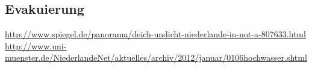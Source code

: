 \subsection{Evakuierung}
\url{http://www.spiegel.de/panorama/deich-undicht-niederlande-in-not-a-807633.html}
\url{http://www.uni-muenster.de/NiederlandeNet/aktuelles/archiv/2012/januar/0106hochwasser.shtml}